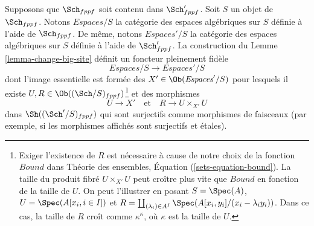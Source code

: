 \begin{lemma}
\label{lemma-fully-faithful}
Supposons que $\Sch_{fppf}$ soit contenu dans $\Sch'_{fppf}$.
Soit $S$ un objet de $\Sch_{fppf}$. Notons
$\textit{Espaces}/S$ la catégorie des espaces algébriques sur $S$
définie à l'aide de $\Sch_{fppf}$. De même, notons
$\textit{Espaces}'/S$ la catégorie des espaces algébriques sur $S$
définie à l'aide de $\Sch'_{fppf}$. La construction du
Lemme \ref{lemma-change-big-site}
définit un foncteur pleinement fidèle
$$
\textit{Espaces}/S \longrightarrow \textit{Espaces}'/S
$$
dont l'image essentielle est formée des $X' \in \Ob(\textit{Espaces}'/S)$
pour lesquels il existe $U, R \in \Ob((\Sch/S)_{fppf})$\footnote{Exiger
l'existence de $R$ est nécessaire à cause de notre choix de la fonction $Bound$ dans
Théorie des ensembles, Équation (\ref{sets-equation-bound}). La taille du produit fibré
$U \times_{X'} U$ peut croître plus vite que $Bound$ en fonction de la taille de $U$. On
peut l'illustrer en posant $S = \Spec(A)$, $U = \Spec(A[x_i, i \in I])$ et
$R = \coprod_{(\lambda_i) \in A^I} \Spec(A[x_i, y_i]/(x_i - \lambda_i y_i))$.
Dans ce cas, la taille de $R$ croît comme $\kappa^\kappa$, où $\kappa$ est la
taille de $U$.} et des morphismes
$$
U \longrightarrow X'
\quad\text{et}\quad
R \longrightarrow U \times_{X'} U
$$
dans $\Sh((\Sch'/S)_{fppf})$ qui sont surjectifs comme morphismes de faisceaux
(par exemple, si les morphismes affichés sont surjectifs et \'etales).
\end{lemma}

